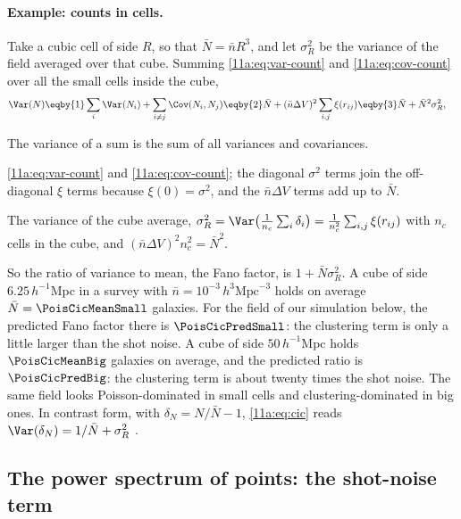 \paragraph{Example: counts in cells.}
Take a cubic cell of side $R$, so that $\bar N=\bar n R^3$, and let $\sigma_R^2$ be
the variance of the field averaged over that cube. Summing
\eqref{11a:eq:var-count} and \eqref{11a:eq:cov-count} over all the small cells
inside the cube,
\begin{align}
  \Var(N)
  &\eqby{1} \sum_{i}\Var(N_i)+\sum_{i\neq j}\Cov(N_i,N_j)
   \eqby{2} \bar N+(\bar n\Delta V)^2\sum_{i,j}\xi(r_{ij})
   \eqby{3} \bar N+\bar N^2\sigma_R^2 , \label{11a:eq:cic}
\end{align}
\begin{explain}
  \item The variance of a sum is the sum of all variances and covariances.
  \item \eqref{11a:eq:var-count} and \eqref{11a:eq:cov-count}; the diagonal
        $\sigma^2$ terms join the off-diagonal $\xi$ terms because
        $\xi(0)=\sigma^2$, and the $\bar n\Delta V$ terms add up to $\bar N$.
  \item The variance of the cube average,
        $\sigma_R^2=\Var\bigl(\frac{1}{n_c}\sum_i\delta_i\bigr)
        =\frac{1}{n_c^2}\sum_{i,j}\xi(r_{ij})$ with $n_c$ cells in the cube, and
        $(\bar n\Delta V)^2 n_c^2=\bar N^2$.
\end{explain}
So the ratio of variance to mean, the Fano factor, is $1+\bar N\sigma_R^2$. A
cube of side $6.25\,h^{-1}$Mpc in a survey with $\bar n=10^{-3}\,h^3\mathrm{Mpc}^{-3}$
holds on average $\bar N=\PoisCicMeanSmall$ galaxies. For the field of our
simulation below, the predicted Fano factor there is $\PoisCicPredSmall$: the
clustering term is only a little larger than the shot noise. A cube of side
$50\,h^{-1}$Mpc holds $\PoisCicMeanBig$ galaxies on average, and the predicted
ratio is $\PoisCicPredBig$: the clustering term is about twenty times the shot
noise. The same field looks Poisson-dominated in small cells and clustering-dominated in
big ones. In contrast form, with $\delta_N=N/\bar N-1$, \eqref{11a:eq:cic} reads
$\Var(\delta_N)=1/\bar N+\sigma_R^2$ .

\subsection{The power spectrum of points: the shot-noise term}
\label{11a:sec:shot}


